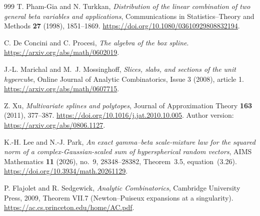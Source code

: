 \documentclass[11pt,a4paper]{article}
\theoremstyle{definition}
\theoremstyle{remark}
\numberwithin{equation}{section}
\begin{document}
\begin{thebibliography}{999}
T. Pham-Gia and N. Turkkan,
\emph{Distribution of the linear combination of two general beta
variables and applications}, Communications in Statistics--Theory
and Methods \textbf{27} (1998), 1851--1869.
\url{https://doi.org/10.1080/03610929808832194}.

C. De Concini and C. Procesi, \emph{The algebra of the box spline}.
\url{https://arxiv.org/abs/math/0602019}.

J.-L. Marichal and M.~J. Mossinghoff,
\emph{Slices, slabs, and sections of the unit hypercube},
Online Journal of Analytic Combinatorics, Issue 3 (2008), article 1.
\url{https://arxiv.org/abs/math/0607715}.

Z. Xu, \emph{Multivariate splines and polytopes},
Journal of Approximation Theory \textbf{163} (2011), 377--387.
\url{https://doi.org/10.1016/j.jat.2010.10.005}.
Author version: \url{https://arxiv.org/abs/0806.1127}.

K.-H. Lee and N.-J. Park,
\emph{An exact gamma--beta scale-mixture law for the squared norm of a
complex-Gaussian-scaled sum of hyperspherical random vectors},
AIMS Mathematics \textbf{11} (2026), no.~9, 28348--28382,
Theorem~3.5, equation~(3.26).
\url{https://doi.org/10.3934/math.20261129}.

P. Flajolet and R. Sedgewick,
\emph{Analytic Combinatorics}, Cambridge University Press, 2009,
Theorem VII.7 (Newton--Puiseux expansions at a singularity).
\url{https://ac.cs.princeton.edu/home/AC.pdf}.
\end{thebibliography}
\end{document}
